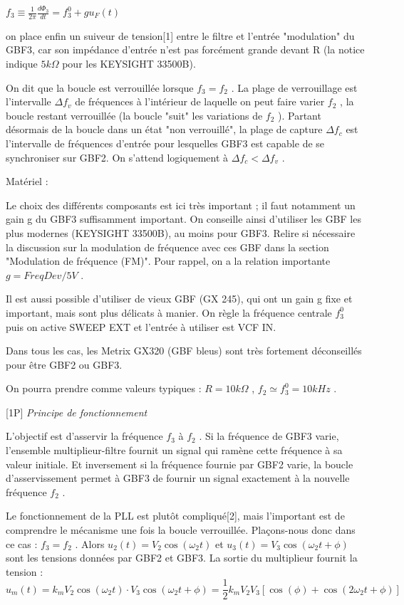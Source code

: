 \documentclass{article}%
\begin{document}
$f_3 \equiv \frac{1}{2 \pi} \frac{d \Phi_3}{dt} = f_3^0 + g u_F(t)$

    on place enfin un suiveur de tension[1] entre le filtre et l'entrée "modulation" du GBF3, car son impédance d'entrée n'est pas forcément grande devant R (la notice indique $5 k \Omega$ pour les KEYSIGHT 33500B). 

On dit que la boucle est verrouillée lorsque $f_3 = f_2$ . La plage de verrouillage est l’intervalle $\Delta f_v$ de fréquences à l'intérieur de laquelle on peut faire varier $f_2$ , la boucle restant verrouillée (la boucle "suit" les variations de $f_2$ ). Partant désormais de la boucle dans un état "non verrouillé", la plage de capture $\Delta f_c$ est l’intervalle de fréquences d’entrée pour lesquelles GBF3 est capable de se synchroniser sur GBF2. On s'attend logiquement à $\Delta f_c < \Delta f_v$ .

Matériel :

Le choix des différents composants est ici très important ; il faut notamment un gain g du GBF3 suffisamment important. On conseille ainsi d'utiliser les GBF les plus modernes (KEYSIGHT 33500B), au moins pour GBF3. Relire si nécessaire la discussion sur la modulation de fréquence avec ces GBF dans la section "Modulation de fréquence (FM)". Pour rappel, on a la relation importante $ g = Freq Dev/5  V$ .

Il est aussi possible d'utiliser de vieux GBF (GX 245), qui ont un gain g fixe et important, mais sont plus délicats à manier. On règle la fréquence centrale $f_3^0$ puis on active SWEEP EXT et l'entrée à utiliser est VCF IN.

Dans tous les cas, les Metrix GX320 (GBF bleus) sont très fortement déconseillés pour être GBF2 ou GBF3.


On pourra prendre comme valeurs typiques : $R = 10  k \Omega$ , $ f_2 \simeq f_3^0 = 10 kHz$ .


[1P] \textit{Principe de fonctionnement}

L'objectif est d'asservir la fréquence $f_3$ à $f_2$ . Si la fréquence de GBF3 varie, l'ensemble multiplieur-filtre fournit un signal qui ramène cette fréquence à sa valeur initiale. Et inversement si la fréquence fournie par GBF2 varie, la boucle d’asservissement permet à GBF3 de fournir un signal exactement à la nouvelle fréquence $f_2$ .

Le fonctionnement de la PLL est plutôt compliqué[2], mais l'important est de comprendre le mécanisme une fois la boucle verrouillée. Plaçons-nous donc dans ce cas : $f_3 = f_2$ . Alors $u_2(t)=V_{2} \cos(\omega_2 t)$ et $u_3(t)=V_{3} \cos(\omega_2 t + \phi)$ sont les tensions données par GBF2 et GBF3. La sortie du multiplieur fournit la tension :
\[ u_m(t) =k_m V_{2} \cos (\omega_2 t)\cdot V_{3} \cos (\omega_2 t + \phi) =\frac{1}{2}k_m V_{2} V_{3} \left[ \cos(\phi) + \cos( 2 \omega_2 t +\phi) \right]\]
\end{document}
